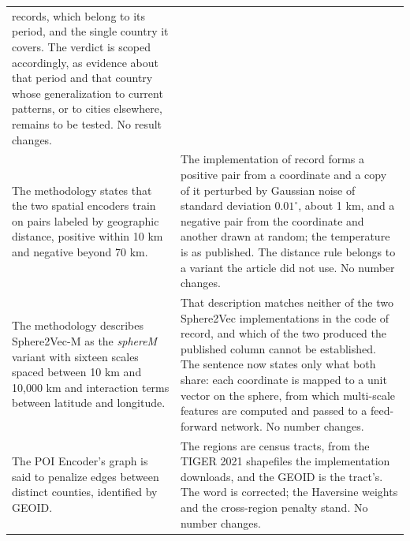 \begin{table}[htb]
\begin{tabular}{@{}p{}p{}@{}}
records, which belong to its period, and the single country it covers. The verdict is
scoped accordingly, as evidence about that period and that country whose generalization to
current patterns, or to cities elsewhere, remains to be tested. No result changes. \\
\addlinespace
The methodology states that the two spatial encoders train on
pairs labeled by geographic distance, positive within 10 km and
negative beyond 70 km. &
The implementation of record forms a positive pair from a
coordinate and a copy of it perturbed by Gaussian noise of
standard deviation $0.01^{\circ}$, about 1 km, and a negative pair
from the coordinate and another drawn at random; the temperature
is as published. The distance rule belongs to a variant the
article did not use. No number changes. \\
\addlinespace
The methodology describes Sphere2Vec-M as the \textit{sphereM}
variant with sixteen scales spaced between 10 km and 10,000 km and
interaction terms between latitude and longitude. &
That description matches neither of the two Sphere2Vec
implementations in the code of record, and which of the two
produced the published column cannot be established. The sentence
now states only what both share: each coordinate is mapped to a
unit vector on the sphere, from which multi-scale features are
computed and passed to a feed-forward network. No number changes. \\
\addlinespace
The POI Encoder's graph is said to penalize edges between
distinct counties, identified by GEOID. &
The regions are census tracts, from the TIGER 2021 shapefiles the
implementation downloads, and the GEOID is the tract's. The word is
corrected; the Haversine weights and the cross-region penalty
stand. No number changes. \\
\bottomrule
\end{tabular}
\end{table}
